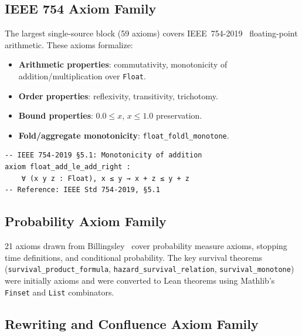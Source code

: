 \subsection{IEEE 754 Axiom Family}

The largest single-source block (59 axioms) covers IEEE~754-2019~\cite{IEEE754_2019} floating-point
arithmetic. These axioms formalize:

\begin{itemize}
  \item \textbf{Arithmetic properties}: commutativity, monotonicity of
        addition/multiplication over \texttt{Float}.
  \item \textbf{Order properties}: reflexivity, transitivity, trichotomy.
  \item \textbf{Bound properties}: $0.0 \leq x$, $x \leq 1.0$ preservation.
  \item \textbf{Fold/aggregate monotonicity}: \texttt{float\_foldl\_monotone}.
\end{itemize}

\begin{lstlisting}
-- IEEE 754-2019 §5.1: Monotonicity of addition
axiom float_add_le_add_right :
    ∀ (x y z : Float), x ≤ y → x + z ≤ y + z
-- Reference: IEEE Std 754-2019, §5.1
\end{lstlisting}

\subsection{Probability Axiom Family}

21 axioms drawn from Billingsley~\cite{Billingsley1995} cover probability measure axioms,
stopping time definitions, and conditional probability. The key survival theorems
(\texttt{survival\_product\_formula}, \texttt{hazard\_survival\_relation},
\texttt{survival\_monotone}) were initially axioms and were converted to Lean
theorems using Mathlib's \texttt{Finset} and \texttt{List} combinators.

\subsection{Rewriting and Confluence Axiom Family}

